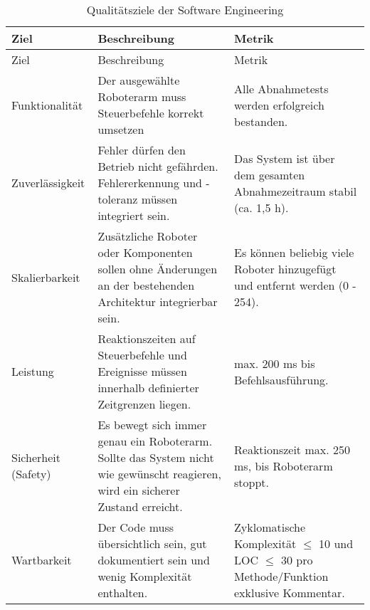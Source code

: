\begin{longtable}{|>{\raggedright\arraybackslash}p{4cm}|>{\raggedright\arraybackslash}p{5cm}|>{\raggedright\arraybackslash}p{5cm}|}
	\caption{Qualitätsziele der Software Engineering} \label{tab:seziele} \\
	\hline
	Ziel & Beschreibung & Metrik \\
	\hline
	\endfirsthead
	
	\hline
	Ziel & Beschreibung & Metrik \\
	\hline
	\endhead
	
	\hline  
	\endfoot
   
        Funktionalität &  
        Der ausgewählte Roboterarm muss Steuerbefehle korrekt umsetzen
        & Alle Abnahmetests werden erfolgreich bestanden.
        \\
        \hline
        Zuverlässigkeit & 
        Fehler dürfen den Betrieb nicht gefährden. Fehlererkennung und -toleranz müssen integriert sein.
        & Das System ist über dem gesamten Abnahmezeitraum stabil (ca. 1,5 h).
        \\
        \hline
        Skalierbarkeit & 
        Zusätzliche Roboter oder Komponenten sollen ohne Änderungen an der bestehenden Architektur integrierbar sein. 
        & Es können beliebig viele Roboter hinzugefügt und entfernt werden (0 - 254).
        \\
        \hline
        Leistung & 
        Reaktionszeiten auf Steuerbefehle und Ereignisse müssen innerhalb definierter Zeitgrenzen liegen. 
        & max. 200 ms bis Befehlsausführung.
        \\
        \hline
        Sicherheit (Safety) & 
        Es bewegt sich immer genau ein Roboterarm. Sollte das System nicht wie gewünscht reagieren, wird ein sicherer Zustand erreicht.
        & Reaktionszeit max. 250 ms, bis Roboterarm stoppt.
        \\
        \hline
        Wartbarkeit & 
        Der Code muss übersichtlich sein, gut dokumentiert sein und wenig Komplexität enthalten. 
        & Zyklomatische Komplexität $\leq$ 10 und LOC $\leq$ 30 pro Methode/Funktion exklusive Kommentar. \\
        \hline

\end{longtable}
